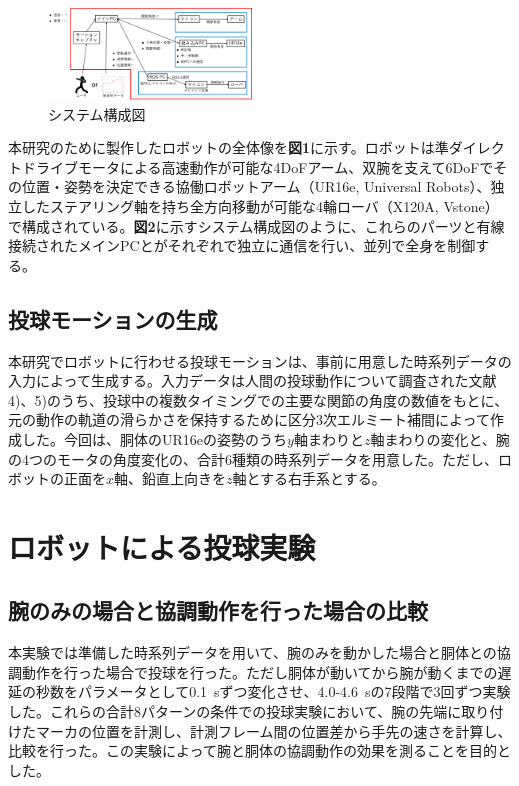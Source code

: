 \documentclass[9pt, twocolumn, a4paper]{jsarticle_kijou}
\begin{document}
 \begin{figure}[tbp]
  \centering
  \includegraphics[width=0.48\textwidth]{fig/system_block.png}
  \caption{システム構成図}
  \label{figure:system_block}
 \end{figure}
本研究のために製作したロボットの全体像を\textbf{図1}に示す。ロボットは準ダイレクトドライブモータによる高速動作が可能な4DoFアーム、双腕を支えて6DoFでその位置・姿勢を決定できる協働ロボットアーム（UR16e, Universal Robots）、独立したステアリング軸を持ち全方向移動が可能な4輪ローバ（X120A, Vstone）で構成されている。\textbf{図2}に示すシステム構成図のように、これらのパーツと有線接続されたメインPCとがそれぞれで独立に通信を行い、並列で全身を制御する。\par

\subsection{投球モーションの生成}
本研究でロボットに行わせる投球モーションは、事前に用意した時系列データの入力によって生成する。入力データは人間の投球動作について調査された文献4)、5)のうち、投球中の複数タイミングでの主要な関節の角度の数値をもとに、元の動作の軌道の滑らかさを保持するために区分3次エルミート補間によって作成した。今回は、胴体のUR16eの姿勢のうち$y$軸まわりと$z$軸まわりの変化と、腕の4つのモータの角度変化の、合計6種類の時系列データを用意した。ただし、ロボットの正面を$x$軸、鉛直上向きを$z$軸とする右手系とする。\par

\section{ロボットによる投球実験}
\subsection{腕のみの場合と協調動作を行った場合の比較}
本実験では準備した時系列データを用いて、腕のみを動かした場合と胴体との協調動作を行った場合で投球を行った。ただし胴体が動いてから腕が動くまでの遅延の秒数をパラメータとして0.1~sずつ変化させ、4.0-4.6~sの7段階で3回ずつ実験した。これらの合計8パターンの条件での投球実験において、腕の先端に取り付けたマーカの位置を計測し、計測フレーム間の位置差から手先の速さを計算し、比較を行った。この実験によって腕と胴体の協調動作の効果を測ることを目的とした。\par
\end{document}
